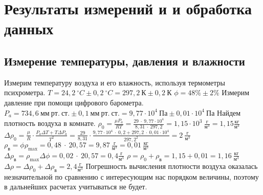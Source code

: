 \documentclass[a4paper,11pt]{article}
\begin{document}
\section{Результаты измерений и и обработка данных}
\subsection{Измерение температуры, давления и влажности}
Измерим температуру воздуха и его влажность, используя термометры психрометра.\newline\newline
$T = 24,2\ ^{\circ} C \pm 0,2\ ^{\circ} C = 297,2\ К \pm 0,2\ К$\newline\newline
$\phi = 48\% \pm 2\%$\newline\newline
Измерим давление при помощи цифрового барометра.\newline\newline
$P_{a} = 734,6\ мм\ рт.\ ст. \pm 0,1\ мм\ рт.\ ст. = 9,77 \cdot 10^{4}\ Па \pm 0,01 \cdot 10^{4}\ Па$\newline\newline
Найдем плотность воздуха в комнате.\newline\newline
$\rho_{0} = \frac{\mu P_{a}}{RT} = \frac{29\ \cdot\ 9,77 \cdot 10^{4}}{8,31\ \cdot\ 297,2} = 1,15 \cdot 10^{3}\ \frac{г}{м^{3}} = 1,15 \frac{кг}{м^{3}}$\newline\newline
$\Delta \rho_{0} = \frac{\mu}{R} \cdot \frac{P_{a} \Delta T + T \Delta P_{a}}{T^{2}} = \frac{29}{8,31} \cdot \frac{9,77 \cdot 10^{4}\ \cdot\ 0,2 + 297,2\ \cdot\ 0,01 \cdot 10^{4}}{297,2^{2}} = 2\ \frac{г}{м^{3}}$\newline\newline
$\rho_{в} = \phi \rho_{\max} = 0,48\ \cdot\ 20,57 = 9,87\ \frac{г}{м^{3}} = 0,01\ \frac{кг}{м^{3}}$\newline\newline
$\Delta \rho_{в}= \rho_{\max}\Delta \phi = 0,02\ \cdot\ 20,57 = 0,4 \frac{г}{м^{3}}$\newline\newline
$\rho = \rho_{0} + \rho_{в} = 1,15 + 0,01 = 1,16\ \frac{кг}{м^{3}}$\newline\newline
$\Delta \rho = \Delta \rho_{0} + \Delta \rho_{в} = 2,4 \frac{г}{м^{3}}$\newline\newline
Погрешность вычисления плотности воздуха оказалась незначительной по сравнению с интересующим нас порядком величины, поэтому в дальнейших расчетах учитываться не будет.
\end{document}
